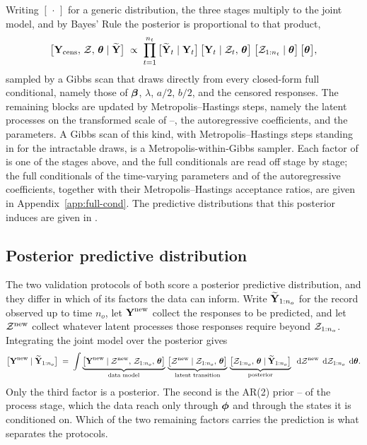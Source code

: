 \documentclass[12pt]{article}
\begin{document}
Writing $[\,\cdot\,]$ for a generic distribution, the three stages multiply to
the joint model, and by Bayes' Rule the posterior is proportional to that
product,
\begin{align}
  \big[\mbox{\bf Y}_{\mathrm{cens}},\, {\cal Z},\, \mbox{\boldmath $\theta$} \mid \widetilde{\mbox{\bf Y}}\big]
  \;\propto\;
  \prod_{t=1}^{n_t}
  \big[\widetilde{\mbox{\bf Y}}_t \mid \mbox{\bf Y}_t\big]\,
  \big[\mbox{\bf Y}_t \mid {\cal Z}_t,\, \mbox{\boldmath $\theta$}\big]\;
  \big[{\cal Z}_{1:n_t} \mid \mbox{\boldmath $\theta$}\big]\,
  \big[\mbox{\boldmath $\theta$}\big],
  \label{eq:bhm-posterior}
\end{align}
sampled by a Gibbs scan that draws directly from every closed-form full
conditional, namely those of $\mbox{\boldmath $\beta$}$, $\lambda$, $a/2$, $b/2$, and the
censored responses.  The remaining blocks are updated by Metropolis--Hastings
steps, namely the latent processes on the transformed scale of
--, the autoregressive coefficients, and the
\Matern parameters.  A Gibbs scan of this kind, with Metropolis--Hastings steps
standing in for the intractable draws, is a Metropolis-within-Gibbs sampler.
Each factor of
 is one of the stages above, and the full conditionals
are read off stage by stage; the full conditionals of the time-varying
parameters and of the autoregressive coefficients, together with their
Metropolis--Hastings acceptance ratios, are given in
Appendix~\ref{app:full-cond}.  The predictive distributions that this
posterior induces are given in .

\subsection{Posterior predictive distribution}\label{sec:meth-pred}

The two validation protocols of  both score a posterior
predictive distribution, and they differ in which of its factors the data can
inform.  Write $\widetilde{\mbox{\bf Y}}_{1:n_o}$ for the record observed up to time
$n_o$, let $\mbox{\bf Y}^{\mathrm{new}}$ collect the responses to be predicted, and let
${\cal Z}^{\mathrm{new}}$ collect whatever latent processes those responses
require beyond ${\cal Z}_{1:n_o}$.  Integrating the joint model
 over the posterior gives
\begin{align}
  \big[\mbox{\bf Y}^{\mathrm{new}} \mid \widetilde{\mbox{\bf Y}}_{1:n_o}\big]
  \;=\;
  \int
  \underbrace{\big[\mbox{\bf Y}^{\mathrm{new}} \mid {\cal Z}^{\mathrm{new}},\, {\cal Z}_{1:n_o},\, \mbox{\boldmath $\theta$}\big]}_{\text{data model}}\,
  \underbrace{\big[{\cal Z}^{\mathrm{new}} \mid {\cal Z}_{1:n_o},\, \mbox{\boldmath $\theta$}\big]}_{\text{latent transition}}\,
  \underbrace{\big[{\cal Z}_{1:n_o},\, \mbox{\boldmath $\theta$} \mid \widetilde{\mbox{\bf Y}}_{1:n_o}\big]}_{\text{posterior}}
  \;\; \text{d}{\cal Z}^{\mathrm{new}}\, \; \text{d}{\cal Z}_{1:n_o}\, \; \text{d}\mbox{\boldmath $\theta$} .
  \label{eq:postpred}
\end{align}
Only the third factor is a posterior.  The second is the AR(2) prior
-- of the process stage, which the data
reach only through $\mbox{\boldmath $\phi$}$ and through the states it is conditioned on.  Which
of the two remaining factors carries the prediction is what separates the
protocols.
\end{document}
